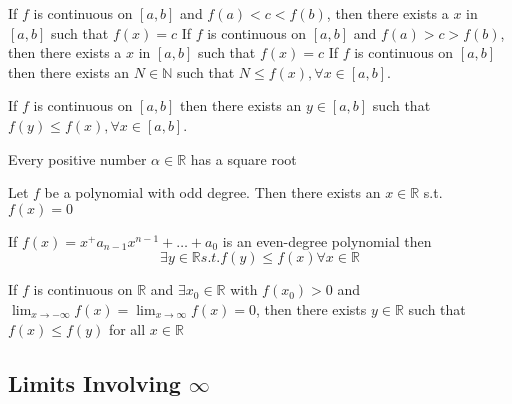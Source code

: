 \documentclass{report}
\begin{document}
   {
    If $f$ is continuous on $[a,b]$ and $f(a) < c < f(b)$, then there
    exists a $x$ in $[a,b]$ such that $f(x)=c$
  }
   {
    If $f$ is continuous on $[a,b]$ and $f(a) > c > f(b)$, then there
    exists a $x$ in $[a,b]$ such that $f(x)=c$
  }
   {
    If $f$ is continuous on $[a,b]$ then there exists an
    $N \in \mathbb{N} $ such that $N \leq f(x), \forall x \in [a,b]$.
  }

   {
    If $f$ is continuous on $[a,b]$ then there exists an
    $y \in [a,b]$ such that $f(y) \leq f(x), \forall x \in [a,b]$.
  }

   {
    Every positive number $\alpha \in \mathbb{R}$ has a square root
  }

   {
    Let $f$ be a polynomial with odd degree.  Then there exists an 
    $x \in \mathbb{R}$ s.t. $f(x)=0$
  }

   {
    If $f(x) = x^ + a_{n-1}x^{n-1} + \dots + a_0$ is an even-degree
    polynomial then
    \[ \exists y \in \mathbb{R} s.t. f(y) \leq f(x) \forall x \in \mathbb{R}  \]
  }

   {
    If $f$ is continuous on $\mathbb{R}$ and $\exists x_0 \in \mathbb{R}$
    with $f(x_0) > 0$ and $\lim_{x \to -\infty} f(x) = \lim_{x \to \infty} f(x) = 0$, then there exists $y \in \mathbb{R}$ such that
    $f(x) \leq f(y)$ for all $x \in \mathbb{R}$
  }

  \subsection{Limits Involving $\infty$}
\end{document}
